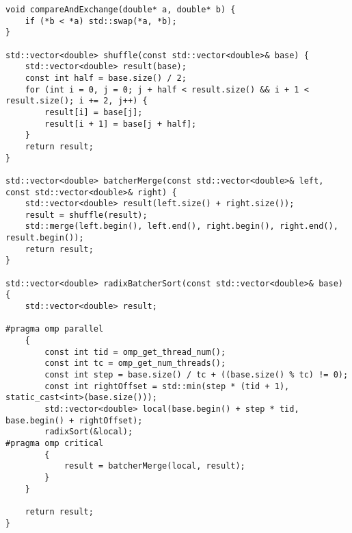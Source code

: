 \documentclass[12pt,a4paper]{article}
\begin{document}
\begin{lstlisting}
void compareAndExchange(double* a, double* b) {
    if (*b < *a) std::swap(*a, *b);
}

std::vector<double> shuffle(const std::vector<double>& base) {
    std::vector<double> result(base);
    const int half = base.size() / 2;
    for (int i = 0, j = 0; j + half < result.size() && i + 1 < result.size(); i += 2, j++) {
        result[i] = base[j];
        result[i + 1] = base[j + half];
    }
    return result;
}

std::vector<double> batcherMerge(const std::vector<double>& left, const std::vector<double>& right) {
    std::vector<double> result(left.size() + right.size());
    result = shuffle(result);
    std::merge(left.begin(), left.end(), right.begin(), right.end(), result.begin());
    return result;
}

std::vector<double> radixBatcherSort(const std::vector<double>& base) {
    std::vector<double> result;

#pragma omp parallel
    {
        const int tid = omp_get_thread_num();
        const int tc = omp_get_num_threads();
        const int step = base.size() / tc + ((base.size() % tc) != 0);
        const int rightOffset = std::min(step * (tid + 1), static_cast<int>(base.size()));
        std::vector<double> local(base.begin() + step * tid, base.begin() + rightOffset);
        radixSort(&local);
#pragma omp critical
        {
            result = batcherMerge(local, result);
        }
    }

    return result;
}
\end{lstlisting}
\end{document}
